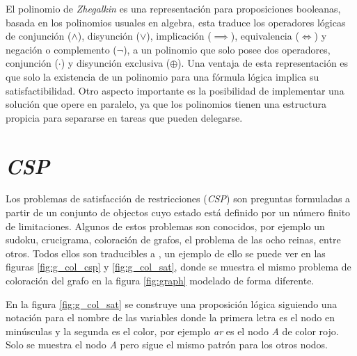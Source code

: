 El polinomio de \textit{Zhegalkin} es una representación para proposiciones booleanas, basada en los polinomios usuales en algebra, esta traduce los operadores lógicas de conjunción ($\land$), disyunción ($\lor$), implicación ($\implies$), equivalencia ($\iff$) y negación o complemento ($\neg$), a un polinomio que solo posee dos operadores, conjunción ($\cdot$) y disyunción exclusiva ($\oplus$). Una ventaja de esta representación es que solo la existencia de un polinomio para una fórmula lógica implica su satisfactibilidad. Otro aspecto importante es la posibilidad de implementar una solución que opere en paralelo, ya que los polinomios tienen una estructura propicia para separarse en tareas que pueden delegarse.

\section{\textit{CSP}}

Los problemas de satisfacción de restricciones (\textit{CSP}) son preguntas formuladas a partir de un conjunto de objectos cuyo estado está definido por un número finito de limitaciones. Algunos de estos problemas son conocidos, por ejemplo un sudoku, crucigrama, coloración de grafos, el problema de las ocho reinas, entre otros. Todos ellos son traducibles a \sat, un ejemplo de ello se puede ver en las figuras \ref{fig:g_col_csp} y \ref{fig:g_col_sat}, donde se muestra el mismo problema de coloración del grafo en la figura \ref{fig:graph} modelado de forma diferente.

En la figura \ref{fig:g_col_sat} se construye una proposición lógica siguiendo una notación para el nombre de las variables donde la primera letra es el nodo en minúsculas y la segunda es el color, por ejemplo \textit{ar} es el nodo \textit{A} de color rojo. Solo se muestra el nodo \textit{A} pero sigue el mismo patrón para los otros nodos.

